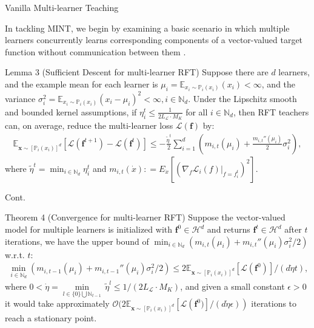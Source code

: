 \documentclass[aspectratio=169,xcolor=dvipsnames]{beamer}
\begin{document}
\begin{frame}{Vanilla Multi-learner Teaching}

In tackling MINT, we begin by examining a basic scenario in which \alert{multiple} learners \alert{concurrently} learns corresponding components of a vector-valued target function \alert{without communication} between them \cite{kakade2012regularization,cesamultitask}.

\begin{block}{Lemma 3 (Sufficient Descent for multi-learner RFT)}
Suppose there are $d$ learners, and the example \alert{mean} for each learner is $\mu_i=\mathbb{E}_{x_i\sim\mathbb{P}_i(x_i)}(x_i)<\infty$, and the \alert{variance} $\sigma_i^2=\mathbb{E}_{x_i\sim\mathbb{P}_i(x_i)}(x_i-\mu_i)^2<\infty, i\in\mathbb{N}_d$. Under the \alert{Lipschitz smooth and bounded kernel assumptions}, if $\eta^t_i\leq \frac{1}{2L_\mathcal{L}\cdot M_K}$ for all $i\in\mathbb{N}_d$, then RFT teachers can, \alert{on average}, reduce the multi-learner loss $\mathcal{L}(\bm{f})$ by:
\begin{eqnarray}
\mathbb{E}_{\bm{x}\sim[\mathbb{P}_i(x_i)]^d}\left[\mathcal{L}(\bm{f}^{t+1})-\mathcal{L}(\bm{f}^t)\right]\leq-\frac{\tilde{\eta}^t}{2}\sum_{i=1}^d (m_{i,t}(\mu_i)+\frac{m_{i,t}''(\mu_i)}{2}\sigma_i^2),
\end{eqnarray}
where $\tilde{\eta}^t=\min_{i\in\mathbb{N}_d}\eta^t_i$ and $m_{i,t}(\dot{x})\mathrel{\mathop:}= E_{\dot{x}}[(\left.\nabla_f\mathcal{L}_i(f)\right|_{f=f^{t}_i})^2]$.
\end{block}

\end{frame}

\begin{frame}{Cont.}
\begin{block}{Theorem 4 (Convergence for multi-learner RFT)}    
Suppose the \alert{vector-valued} model for multiple learners is initialized with $\bm{f}^0\in\mathcal{H}^d$ and returns $\bm{f}^t\in\mathcal{H}^d$ after $t$ iterations, we have the \alert{upper bound} of $\min_{i\in\mathbb{N}_d} \left(m_{i,t}(\mu_i)+m_{i,t}''(\mu_i)\sigma_i^2/2\right)$ w.r.t. $t$:
	\begin{eqnarray}\label{eqcpft}
		\min_{i\in\mathbb{N}_d} \left(m_{i,t-1}(\mu_i)+m_{i,t-1}''(\mu_i)\sigma_i^2/2\right)\leq2\mathbb{E}_{\bm{x}\sim[\mathbb{P}_i(x_i)]^d}\left[\mathcal{L}(\bm{f}^0)\right]/(d\dot{\eta}t),
	\end{eqnarray}
	where $0<\dot{\eta}=\underset{l\in\{0\}\bigcup\mathbb{N}_{t-1}}{\min}\,\tilde{\eta}^l\leq 1/(2L_\mathcal{L}\cdot M_K)$, and given a small constant $\epsilon>0$ it would take approximately $\mathcal{O}(2\mathbb{E}_{\bm{x}\sim[\mathbb{P}_i(x_i)]^d}\left[\mathcal{L}\left(\bm{f}^0)\right]/(d\dot{\eta}\epsilon)\right)$ iterations to reach a \alert{stationary point}.
\end{block} 
\end{frame}
\end{document}
